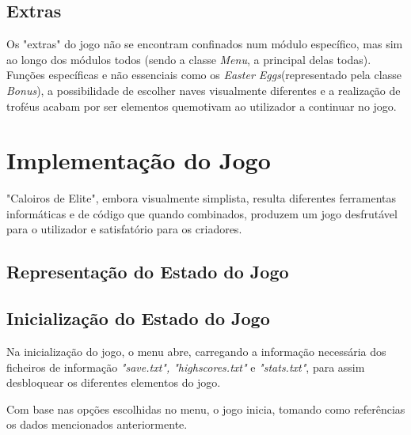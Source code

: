 \documentclass[a4paper,11pt]{article}
\begin{document}
\vspace{8pt}

\subsection*{Extras}

\vspace{8pt}

Os "extras" do jogo não se encontram confinados num módulo específico, mas sim ao longo dos módulos todos (sendo a classe \textit{Menu}, a principal delas todas). Funções específicas e não essenciais como os \textit{Easter Eggs}(representado pela classe \textit{Bonus}), a possibilidade de escolher naves visualmente diferentes e a realização de troféus acabam por ser elementos quemotivam ao utilizador a continuar no jogo.

\pagebreak

\section{Implementação do Jogo}

\vspace{8pt}

"Caloiros de Elite", embora visualmente simplista, resulta diferentes ferramentas informáticas e de código que quando combinados, produzem um jogo desfrutável para o utilizador e satisfatório para os criadores.

\vspace{8pt}

\subsection{Representação do Estado do Jogo}
\pagebreak

\subsection{Inicialização do Estado do Jogo}

\vspace{8pt}

Na inicialização do jogo, o menu abre, carregando a informação necessária dos ficheiros de informação \textit{"save.txt", "highscores.txt"} e \textit{"stats.txt"}, para assim desbloquear os diferentes elementos do jogo.

\vspace{8pt}

Com base nas opções escolhidas no menu, o jogo inicia, tomando como referências os dados mencionados anteriormente.
\end{document}
